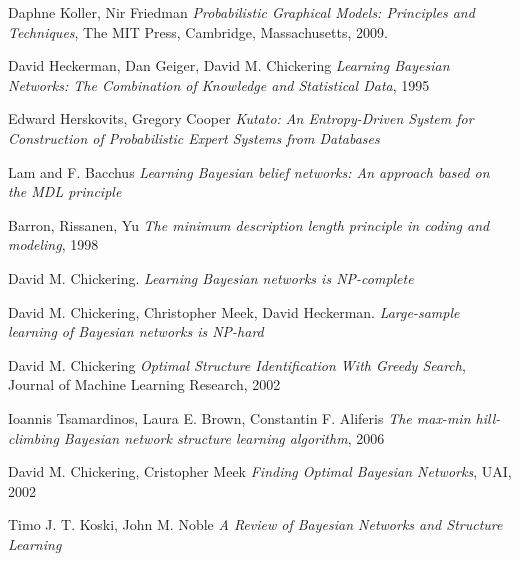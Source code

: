 \documentclass{article}
\begin{document}
\begin{thebibliography}{9}
	
	Daphne Koller, Nir Friedman
	\emph{Probabilistic Graphical Models: Principles and Techniques},
	The MIT Press, Cambridge, Massachusetts,
	2009.
	
	David Heckerman, Dan Geiger, David M. Chickering
	\emph{Learning Bayesian Networks: The Combination of Knowledge and Statistical Data}, 1995
	
	Edward Herskovits, Gregory Cooper
	\emph{Kutato: An Entropy-Driven System for Construction of Probabilistic Expert Systems from Databases}
	
	Lam and F. Bacchus
	\emph{Learning Bayesian belief networks: An approach based on the MDL principle}
	
	Barron, Rissanen, Yu
	\emph{The minimum description length principle in coding
	and modeling}, 1998
	
	David M. Chickering. 
	\emph{Learning Bayesian networks is NP-complete}
	
	David M. Chickering, Christopher  Meek, David Heckerman.    \emph{Large-sample   learning   of
	Bayesian networks is NP-hard}
	
	David M. Chickering
	\emph{Optimal Structure Identification With Greedy Search}, Journal of Machine Learning Research, 2002
	
	Ioannis Tsamardinos, Laura E. Brown, Constantin F. Aliferis
	\emph{The max-min hill-climbing Bayesian network
	structure learning algorithm}, 2006
	
	David M. Chickering, Cristopher Meek
	\emph{Finding Optimal Bayesian Networks}, UAI, 2002
	
	Timo J. T. Koski, John M. Noble
	\emph{A Review of Bayesian Networks and Structure Learning}
	
\end{thebibliography}
\end{document}
